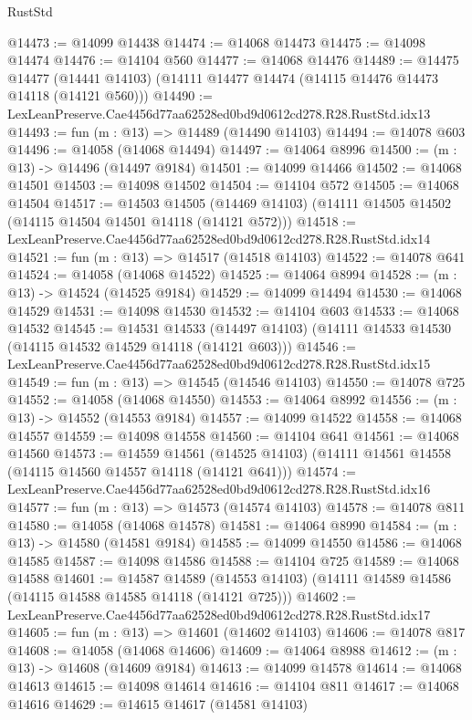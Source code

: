 \begin{lexlean}{RustStd}
\begin{coremodule}
@14473 := @14099 @14438
@14474 := @14068 @14473
@14475 := @14098 @14474
@14476 := @14104 @560
@14477 := @14068 @14476
@14489 := @14475
    @14477
    (@14441 @14103)
    (@14111 @14477 @14474 (@14115 @14476 @14473 @14118 (@14121 @560)))
@14490 := LexLeanPreserve.Cae4456d77aa62528ed0bd9d0612cd278.R28.RustStd.idx13
@14493 := fun (m : @13) => @14489 (@14490 @14103)
@14494 := @14078 @603
@14496 := @14058 (@14068 @14494)
@14497 := @14064 @8996
@14500 := (m : @13) -> @14496 (@14497 @9184)
@14501 := @14099 @14466
@14502 := @14068 @14501
@14503 := @14098 @14502
@14504 := @14104 @572
@14505 := @14068 @14504
@14517 := @14503
    @14505
    (@14469 @14103)
    (@14111 @14505 @14502 (@14115 @14504 @14501 @14118 (@14121 @572)))
@14518 := LexLeanPreserve.Cae4456d77aa62528ed0bd9d0612cd278.R28.RustStd.idx14
@14521 := fun (m : @13) => @14517 (@14518 @14103)
@14522 := @14078 @641
@14524 := @14058 (@14068 @14522)
@14525 := @14064 @8994
@14528 := (m : @13) -> @14524 (@14525 @9184)
@14529 := @14099 @14494
@14530 := @14068 @14529
@14531 := @14098 @14530
@14532 := @14104 @603
@14533 := @14068 @14532
@14545 := @14531
    @14533
    (@14497 @14103)
    (@14111 @14533 @14530 (@14115 @14532 @14529 @14118 (@14121 @603)))
@14546 := LexLeanPreserve.Cae4456d77aa62528ed0bd9d0612cd278.R28.RustStd.idx15
@14549 := fun (m : @13) => @14545 (@14546 @14103)
@14550 := @14078 @725
@14552 := @14058 (@14068 @14550)
@14553 := @14064 @8992
@14556 := (m : @13) -> @14552 (@14553 @9184)
@14557 := @14099 @14522
@14558 := @14068 @14557
@14559 := @14098 @14558
@14560 := @14104 @641
@14561 := @14068 @14560
@14573 := @14559
    @14561
    (@14525 @14103)
    (@14111 @14561 @14558 (@14115 @14560 @14557 @14118 (@14121 @641)))
@14574 := LexLeanPreserve.Cae4456d77aa62528ed0bd9d0612cd278.R28.RustStd.idx16
@14577 := fun (m : @13) => @14573 (@14574 @14103)
@14578 := @14078 @811
@14580 := @14058 (@14068 @14578)
@14581 := @14064 @8990
@14584 := (m : @13) -> @14580 (@14581 @9184)
@14585 := @14099 @14550
@14586 := @14068 @14585
@14587 := @14098 @14586
@14588 := @14104 @725
@14589 := @14068 @14588
@14601 := @14587
    @14589
    (@14553 @14103)
    (@14111 @14589 @14586 (@14115 @14588 @14585 @14118 (@14121 @725)))
@14602 := LexLeanPreserve.Cae4456d77aa62528ed0bd9d0612cd278.R28.RustStd.idx17
@14605 := fun (m : @13) => @14601 (@14602 @14103)
@14606 := @14078 @817
@14608 := @14058 (@14068 @14606)
@14609 := @14064 @8988
@14612 := (m : @13) -> @14608 (@14609 @9184)
@14613 := @14099 @14578
@14614 := @14068 @14613
@14615 := @14098 @14614
@14616 := @14104 @811
@14617 := @14068 @14616
@14629 := @14615
    @14617
    (@14581 @14103)

\end{coremodule}
\end{lexlean}
